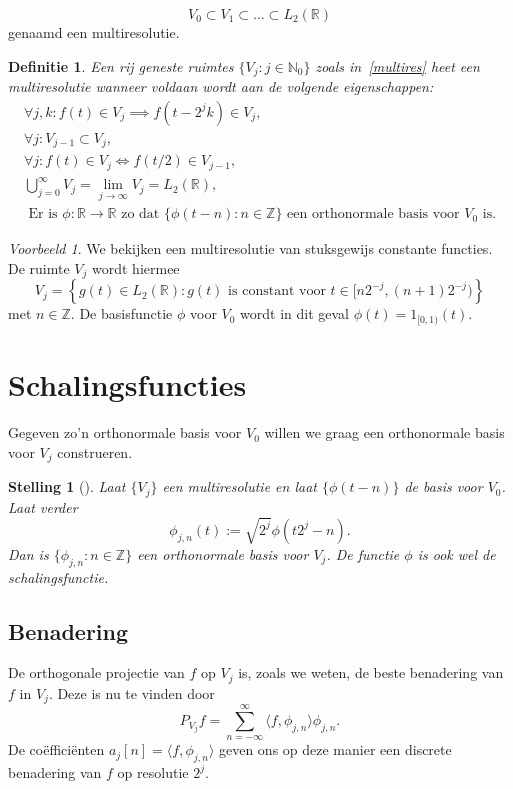 \documentclass[11pt]{report}
\newcommand{\R}{\mathbb{R}}
\newcommand{\N}{\mathbb{N}}
\newcommand{\Z}{\mathbb{Z}}
\theoremstyle{plain}
\newtheorem*{stelling}{Stelling}
\newtheorem*{definitie}{Definitie}
\theoremstyle{remark}
\newtheorem*{voorbeeld}{Voorbeeld}
\begin{document}
\begin{equation}
  \label{multires}
  V_0 \subset V_1 \subset \ldots \subset L_2(\R)
\end{equation}
genaamd een multiresolutie.
\begin{definitie}
Een rij geneste ruimtes $\{ V_j: j \in \N_0 \}$ zoals in~\ref{multires} heet een multiresolutie wanneer voldaan wordt aan de volgende eigenschappen:
\begin{eqnarray}
  \forall j, k: f(t) \in V_j \implies f(t - 2^j k) \in V_j, \\
  \forall j: V_{j-1} \subset V_j, \\
  \forall j: f(t) \in V_j \iff f(t/2) \in V_{j-1}, \\
  \bigcup_{j=0}^{\infty} V_j = \lim_{j\to\infty} V_j = L_2(\R), \\
  \text{ Er is $\phi: \R \to \R$ zo dat $\{ \phi(t-n): n \in \Z \}$ een orthonormale basis voor $V_0$ is.}
\end{eqnarray}
\end{definitie}

\begin{voorbeeld} We bekijken een multiresolutie van stuksgewijs constante functies. De ruimte $V_j$ wordt hiermee
\[
V_j = \left\{ g(t) \in L_2(\R): g(t)\text{ is constant voor }t \in [n 2^{-j}, (n+1)2^{-j}) \right \}
\] 
met $n \in \Z$. De basisfunctie $\phi$ voor $V_0$ wordt in dit geval $\phi(t) = 1_{[0,1)}(t)$.
\end{voorbeeld}

\section{Schalingsfuncties}
Gegeven zo'n orthonormale basis voor $V_0$ willen we graag een orthonormale basis voor $V_j$ construeren. 
\begin{stelling}[{\cite[T7.1]{mallat}}] 
  Laat $\{ V_j \}$ een multiresolutie en laat $\{\phi(t-n) \}$ de basis voor $V_0$. Laat verder
  \[
    \phi_{j,n}(t) := \sqrt{2^j} \phi\left( t2^j - n \right).
  \]
  Dan is $\{ \phi_{j,n}: n \in \Z \}$ een orthonormale basis voor $V_j$. De functie $\phi$ is ook wel de \emph{schalingsfunctie}.
\end{stelling}
\subsection{Benadering} De orthogonale projectie van $f$ op $V_j$ is, zoals we weten, de beste benadering van $f$ in $V_j$. Deze is nu te vinden door
\[
	P_{V_j} f = \sum_{n=-\infty}^\infty \langle f, \phi_{j,n} \rangle \phi_{j,n}.
\]
De co\"effici\"enten $a_j[n] = \langle f, \phi_{j,n} \rangle$ geven ons op deze manier een discrete benadering van $f$ op resolutie $2^j$.
\end{document}
